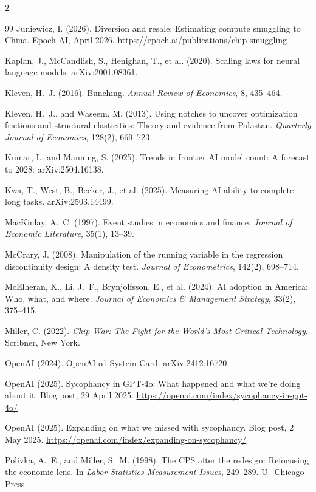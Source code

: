 \documentclass[11pt]{article}
\begin{document}
\begin{multicols}{2}
\begin{thebibliography}{99}
Juniewicz, I. (2026).
Diversion and resale: Estimating compute smuggling to China.
Epoch AI, April 2026.
\url{https://epoch.ai/publications/chip-smuggling}

Kaplan, J., McCandlish, S., Henighan, T., et al. (2020).
Scaling laws for neural language models.
arXiv:2001.08361.

Kleven, H.~J. (2016).
Bunching.
\emph{Annual Review of Economics}, 8, 435--464.

Kleven, H.~J., and Waseem, M. (2013).
Using notches to uncover optimization frictions and structural elasticities:
Theory and evidence from Pakistan.
\emph{Quarterly Journal of Economics}, 128(2), 669--723.

Kumar, I., and Manning, S. (2025).
Trends in frontier AI model count: A forecast to 2028.
arXiv:2504.16138.

Kwa, T., West, B., Becker, J., et al. (2025).
Measuring AI ability to complete long tasks.
arXiv:2503.14499.

MacKinlay, A.~C. (1997).
Event studies in economics and finance.
\emph{Journal of Economic Literature}, 35(1), 13--39.

McCrary, J. (2008).
Manipulation of the running variable in the regression discontinuity design:
A density test.
\emph{Journal of Econometrics}, 142(2), 698--714.

McElheran, K., Li, J.~F., Brynjolfsson, E., et al. (2024).
AI adoption in America: Who, what, and where.
\emph{Journal of Economics \& Management Strategy}, 33(2), 375--415.

Miller, C. (2022).
\emph{Chip War: The Fight for the World's Most Critical Technology}.
Scribner, New York.

OpenAI (2024).
OpenAI o1 System Card.
arXiv:2412.16720.

OpenAI (2025).
Sycophancy in GPT-4o: What happened and what we're doing about it.
Blog post, 29 April 2025.
\url{https://openai.com/index/sycophancy-in-gpt-4o/}

OpenAI (2025).
Expanding on what we missed with sycophancy.
Blog post, 2 May 2025.
\url{https://openai.com/index/expanding-on-sycophancy/}

Polivka, A.~E., and Miller, S.~M. (1998).
The CPS after the redesign: Refocusing the economic lens.
In \emph{Labor Statistics Measurement Issues}, 249--289. U.\ Chicago Press.


\end{thebibliography}
\end{multicols}
\end{document}
